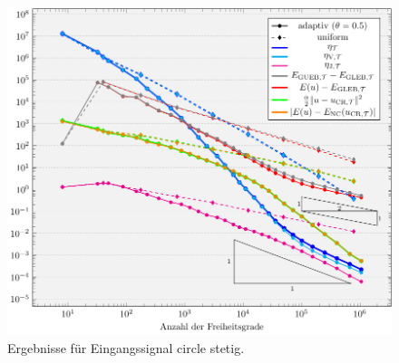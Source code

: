 \begin{figure}[p]
  \centering
  \includegraphics[width=\linewidth]
    {pictures/chapExperiments/secGrayscale/circ/convCont.pdf}
  \caption{Ergebnisse für Eingangssignal circle stetig.}
  \label{fig:circContConvergence}
\end{figure}

